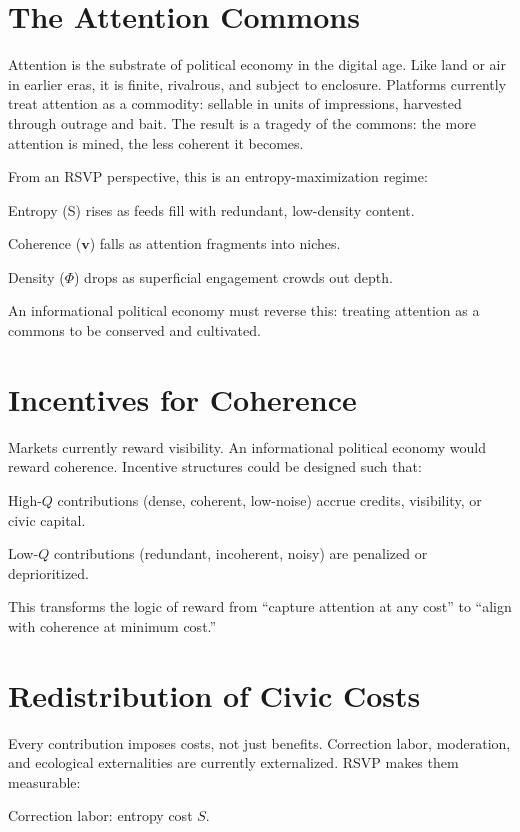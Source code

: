 \documentclass{book}
\begin{document}
\section{The Attention Commons}

Attention is the substrate of political economy in the digital age. Like land or air in earlier eras, it is finite, rivalrous, and subject to enclosure. Platforms currently treat attention as a commodity: sellable in units of impressions, harvested through outrage and bait. The result is a tragedy of the commons: the more attention is mined, the less coherent it becomes.

From an RSVP perspective, this is an entropy-maximization regime:

Entropy (S) rises as feeds fill with redundant, low-density content.

Coherence (\(\mathbf{v}\)) falls as attention fragments into niches.

Density (\(\Phi\)) drops as superficial engagement crowds out depth.

An informational political economy must reverse this: treating attention as a commons to be conserved and cultivated.

\section{Incentives for Coherence}

Markets currently reward visibility. An informational political economy would reward coherence. Incentive structures could be designed such that:

High-\( Q \) contributions (dense, coherent, low-noise) accrue credits, visibility, or civic capital.

Low-\( Q \) contributions (redundant, incoherent, noisy) are penalized or deprioritized.

This transforms the logic of reward from ``capture attention at any cost'' to ``align with coherence at minimum cost.''

\section{Redistribution of Civic Costs}

Every contribution imposes costs, not just benefits. Correction labor, moderation, and ecological externalities are currently externalized. RSVP makes them measurable:

Correction labor: entropy cost \( S \).
\end{document}
